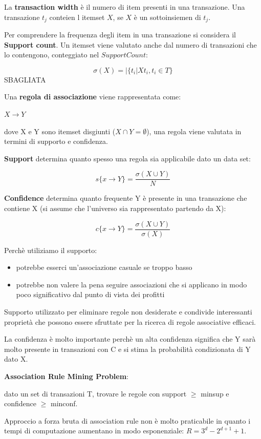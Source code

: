 La \textbf{transaction width} \`e il numero di item presenti in una transazione. Una transazione $t_j$ conteien l itemset $X$, se $X$ \`e un sottoinsiemen di $t_j$.

Per comprendere la frequenza degli item in una transazione si considera il \textbf{Support count}. Un itemset viene valutato anche dal numero di transazioni che lo contengono, conteggiato nel $Support Count$:

\[ \sigma(X) = |\{t_i | X  t_i, t_i \in T\} \] SBAGLIATA

Una \textbf{regola di associazione} viene rappresentata come:

$X \rightarrow Y$

dove X e Y sono itemset disgiunti ($X \cap Y = \emptyset$), una regola viene valutata in termini di supporto e confidenza.

\textbf{Support} determina quanto spesso una regola sia applicabile dato un data set:

\[s\{x \rightarrow Y\} = \frac{\sigma(X \cup Y)}{N}\]

\textbf{Confidence} determina quanto frequente Y \`e presente in una transazione che contiene X (si assume che l'universo sia rappresentato partendo da X):

\[c\{x \rightarrow Y\} = \frac{\sigma(X \cup Y)}{\sigma(X)}\]

Perch\`e utiliziamo il supporto:
\begin{itemize}
	\item potrebbe esserci un'associazione casuale se troppo basso
	\item potrebbe non valere la pena seguire associazioni che si applicano in modo poco significativo dal punto di vista dei profitti 
\end{itemize}
Supporto utilizzato per eliminare regole non desiderate e condivide interessanti propriet\`a che possono essere sfruttate per la ricerca di regole associative efficaci.

La confidenza \`e molto importante perch\`e un alta confidenza significa che Y sar\`a molto presente in transazioni con C e si stima la probabilit\`a  condizionata di Y dato X.

\textbf{Association Rule Mining Problem}:

dato un set di transazioni T, trovare le regole con support $\ge$ minsup e confidence $\ge$ minconf.

Approccio a forza bruta di association rule non \`e molto praticabile in quanto i tempi di computazione aumentano in modo esponenziale: $R = 3^d - 2^{d+1} + 1$.

